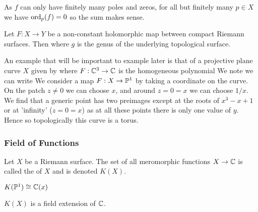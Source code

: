 \documentclass{article}
\begin{document}
\begin{remark}
	As $f$ can only have finitely many poles and zeros, for all but finitely many $p \in X$ we have $\operatorname{ord}_p(f) = 0$ so the sum makes sense. 
\end{remark}

\begin{theorem}
	Let $F:X \to Y$ be a non-constant holomorphic map between compact Riemann surfaces. Then 
where $g$ is the genus of the underlying topological surface. 
\end{theorem}

\begin{example}
	An example that will be important to example later is that of a projective plane curve $X$ given by 
where $F: \mathbb{C}^3 \to \mathbb{C}$ is the homogeneous polynomial 
We note we can write 
We consider a map $F:X \to \mathbb{P}^1$ by taking a coordinate on the curve. On the patch $z \neq 0$ we can choose $x$, and around $z=0=x$ we can choose $1/x$. We find that a generic point has two preimages except at the roots of $x^3-x+1$ or at 'infinity' ($z=0=x$) as at all these points there is only one value of $y$. Hence 
so topologically this curve is a torus.
\end{example}

\subsubsection{Field of Functions}

\begin{definition}
	Let $X$ be a Riemann surface. The set of all meromorphic functions $X \to \mathbb{C}$ is called the  of $X$ and is denoted $K(X)$. 
\end{definition}

\begin{example}
	$K(\mathbb{P}^1) \cong \mathbb{C}(x)$
\end{example}

\begin{prop}
	$K(X)$ is a field extension of $\mathbb{C}$. 
\end{prop}
\end{document}
